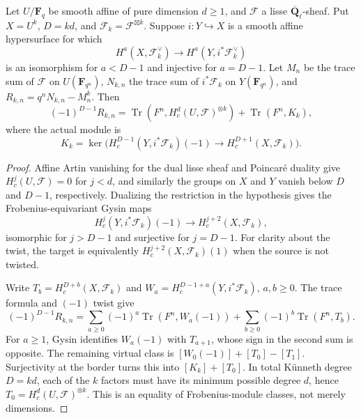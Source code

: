 \begin{proposition}
\label{prop:gysin}
Let $U/\mathbf F_q$ be smooth affine of pure dimension $d\ge1$, and
$\mathcal F$ a lisse $\overline{\mathbf Q}_\ell$-sheaf.  Put
$X=U^k$, $D=kd$, and $\mathcal F_k=\mathcal F^{\boxtimes k}$.
Suppose $i:Y\hookrightarrow X$ is a smooth affine hypersurface for which
\[
 H^a(X,\mathcal F_k^\vee)\longrightarrow
 H^a(Y,i^*\mathcal F_k^\vee)
\]
is an isomorphism for $a<D-1$ and injective for $a=D-1$.
Let $M_n$ be the trace sum of $\mathcal F$ on $U(\mathbf F_{q^n})$,
$N_{k,n}$ the trace sum of $i^*\mathcal F_k$ on $Y(\mathbf F_{q^n})$,
and $R_{k,n}=q^nN_{k,n}-M_n^k$.  Then
\begin{equation}\label{eq:effective}
 (-1)^{D-1}R_{k,n}
   =\operatorname{Tr}(F^n,H_c^d(U,\mathcal F)^{\otimes k})
      +\operatorname{Tr}(F^n,K_k),
\end{equation}
where the actual module is
\begin{equation}\label{eq:kernel}
 K_k=\ker\bigl(H_c^{D-1}(Y,i^*\mathcal F_k)(-1)
                    \longrightarrow H_c^{D+1}(X,\mathcal F_k)\bigr).
\end{equation}
\end{proposition}
\begin{proof}
Affine Artin vanishing for the dual lisse sheaf and Poincar\'e duality
give $H_c^j(U,\mathcal F)=0$ for $j<d$, and similarly the groups on
$X$ and $Y$ vanish below $D$ and $D-1$, respectively.
Dualizing the restriction in the hypothesis gives the Frobenius-equivariant
Gysin maps
\[
 H_c^j(Y,i^*\mathcal F_k)(-1)\longrightarrow
 H_c^{j+2}(X,\mathcal F_k),
\]
isomorphic for $j>D-1$ and surjective for $j=D-1$.
For clarity about the twist, the target is equivalently
$H_c^{j+2}(X,\mathcal F_k)(1)$ when the source is not twisted.

Write $T_b=H_c^{D+b}(X,\mathcal F_k)$ and
$W_a=H_c^{D-1+a}(Y,i^*\mathcal F_k)$, $a,b\ge0$.
The trace formula and $(-1)$ twist give
\[
 (-1)^{D-1}R_{k,n}
 =\sum_{a\ge0}(-1)^a\operatorname{Tr}(F^n,W_a(-1))
   +\sum_{b\ge0}(-1)^b\operatorname{Tr}(F^n,T_b).
\]
For $a\ge1$, Gysin identifies $W_a(-1)$ with $T_{a+1}$, whose sign in
the second sum is opposite.  The remaining virtual class is
$[W_0(-1)]+[T_0]-[T_1]$.  Surjectivity at the border turns this into
$[K_k]+[T_0]$.  In total K\"unneth degree $D=kd$, each of the $k$ factors
must have its minimum possible degree $d$, hence
$T_0=H_c^d(U,\mathcal F)^{\otimes k}$.
This is an equality of Frobenius-module classes, not merely dimensions.
\end{proof}


